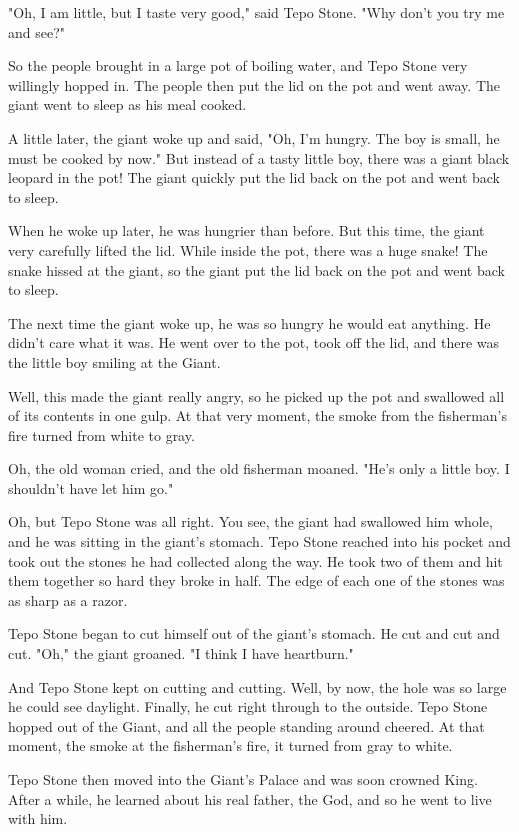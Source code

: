 "Oh, I am little, but I taste very good," said Tepo Stone. "Why don't you try me and see?"

So the people brought in a large pot of boiling water, and Tepo Stone very willingly hopped in. The people then put the lid on the pot and went away. The giant went to sleep as his meal cooked.

A little later, the giant woke up and said, "Oh, I'm hungry. The boy is small, he must be cooked by now." But instead of a tasty little boy, there was a giant black leopard in the pot! The giant quickly put the lid back on the pot and went back to sleep.

When he woke up later, he was hungrier than before. But this time, the giant very carefully lifted the lid. While inside the pot, there was a huge snake! The snake hissed at the giant, so the giant put the lid back on the pot and went back to sleep.

The next time the giant woke up, he was so hungry he would eat anything. He didn't care what it was. He went over to the pot, took off the lid, and there was the little boy smiling at the Giant.

Well, this made the giant really angry, so he picked up the pot and swallowed all of its contents in one gulp. At that very moment, the smoke from the fisherman's fire turned from white to gray.

Oh, the old woman cried, and the old fisherman moaned. "He's only a little boy. I shouldn't have let him go."

Oh, but Tepo Stone was all right. You see, the giant had swallowed him whole, and he was sitting in the giant's stomach. Tepo Stone reached into his pocket and took out the stones he had collected along the way. He took two of them and hit them together so hard they broke in half. The edge of each one of the stones was as sharp as a razor.

Tepo Stone began to cut himself out of the giant's stomach. He cut and cut and cut. "Oh," the giant groaned. "I think I have heartburn."

And Tepo Stone kept on cutting and cutting. Well, by now, the hole was so large he could see daylight. Finally, he cut right through to the outside. Tepo Stone hopped out of the Giant, and all the people standing around cheered. At that moment, the smoke at the fisherman's fire, it turned from gray to white.

Tepo Stone then moved into the Giant's Palace and was soon crowned King. After a while, he learned about his real father, the God, and so he went to live with him.

